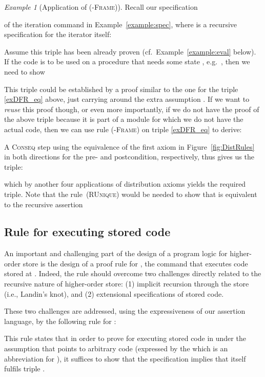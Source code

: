 \documentclass{LMCS}
\theoremstyle{remark}
\newtheorem{example}[theorem]{Example}
\begin{document}
\begin{example}[Application of (\textsc{-Frame})]
\label{example:DFR} 
Recall our specification

of the iteration command in Example~\ref{example:spec}, 
where  is a recursive specification for the iterator itself:

Assume this triple has been already proven (cf.\ Example~\ref{example:eval} below).
If the code  is to be used  on a procedure  that 
 needs some state , e.g.\ , then we need to show

This triple could be established by a proof similar to the one for the triple \ref{exDFR_eq} above, just carrying around the extra assumption . If we want to \emph{reuse} this proof though, or even more importantly, if we do not have the proof of the above triple because it is part of a module for which we do not have the actual code, then we can use rule (\textsc{-Frame}) on triple \eqref{exDFR_eq} to derive:

A \textsc{Conseq} step  using the equivalence of the first axiom in  Figure~\ref{fig:DistRules}  in both directions for the pre- and postcondition, respectively,  thus gives us the triple:

which by another four applications of distribution axioms yields the required triple.
Note that the rule~\textsc{(RUnique)}   would be needed to show   that  is equivalent to the recursive assertion

\end{example}




\subsection{Rule for executing stored code}
\label{subsec:eval-rule}
An important and challenging 
part of the design of a program logic for higher-order store is the
design of a proof rule for , the command
that executes code stored at .
Indeed, the rule should overcome two challenges directly
related to the recursive nature of higher-order store: (1)
implicit recursion through the store (i.e., Landin's knot), and (2)
extensional specifications of stored code.

These two challenges are addressed, using the expressiveness of our
assertion language, by the following rule for :

This rule states that in order to prove  for executing stored code in  under the assumption that  points to arbitrary code  (expressed by the  which is an abbreviation for ), it suffices to show that the specification  implies  that  itself fulfils triple 
. 
\end{document}
